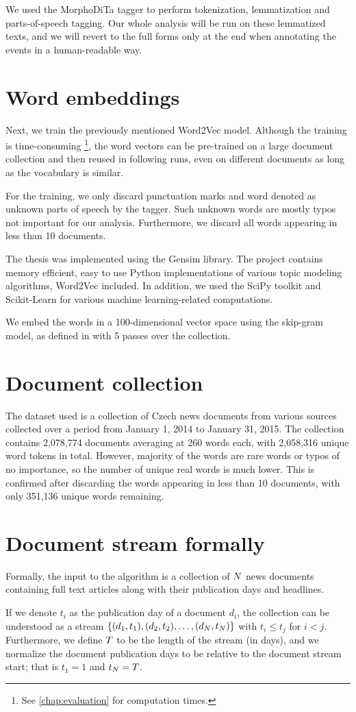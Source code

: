 We used the MorphoDiTa tagger \cite{morphodita} to perform tokenization, lemmatization and parts-of-speech tagging. Our whole analysis will be run on these lemmatized texts, and we will revert to the full forms only at the end when annotating the events in a human-readable way.


\section{Word embeddings} \label{word-embeddings}
Next, we train the previously mentioned Word2Vec model. Although the training is time-consuming \footnote{See \autoref{chap:evaluation} for computation times.}, the word vectors can be pre-trained on a large document collection and then reused in following runs, even on different documents as long as the vocabulary is similar.

For the training, we only discard punctuation marks and word denoted as unknown parts of speech by the tagger. Such unknown words are mostly typos not important for our analysis. Furthermore, we discard all words appearing in less than 10 documents.

The thesis was implemented using the Gensim \cite{gensim} library. The project contains memory efficient, easy to use Python implementations of various topic modeling algorithms, Word2Vec included. In addition, we used the SciPy toolkit \cite{scipy} and Scikit-Learn \cite{scikit-learn} for various machine learning-related computations.

We embed the words in a 100-dimensional vector space using the skip-gram model, as defined in \cite{Word2Vec} with 5 passes over the collection.


\section{Document collection}
The dataset used is a collection of Czech news documents from various sources collected over a period from January 1, 2014 to January 31, 2015. The collection contains 2,078,774 documents averaging at 260 words each, with 2,058,316 unique word tokens in total. However, majority of the words are rare words or typos of no importance, so the number of unique real words is much lower. This is confirmed after discarding the words appearing in less than 10 documents, with only 351,136 unique words remaining.


\section{Document stream formally}
Formally, the input to the algorithm is a collection of $N$ news documents containing full text articles along with their publication days and headlines.

If we denote $t_{i}$ as the publication day of a document $d_{i}$, the collection can be understood as a stream $\left\{ (d_{1}, t_{1}), (d_{2}, t_{2}), \dots, (d_{N}, t_{N}) \right\}$ with $t_{i} \leq t_{j}$ for $i < j$. Furthermore, we define $T$ to be the length of the stream (in days), and we normalize the document publication days to be relative to the document stream start; that is $t_{1} = 1$ and $t_{N} = T$.